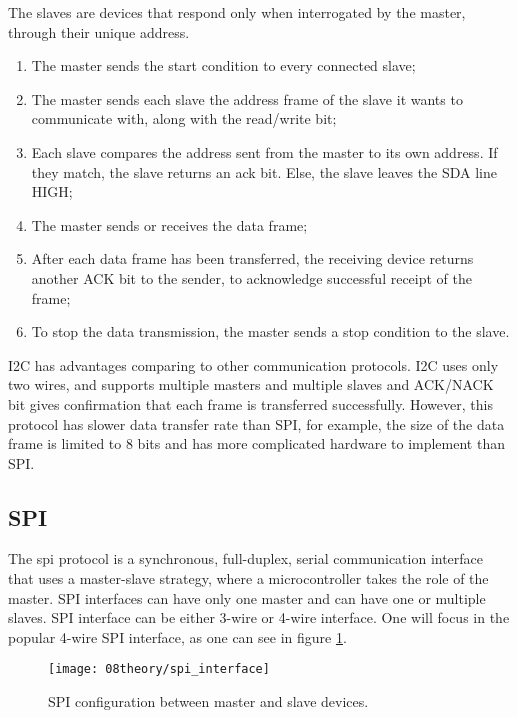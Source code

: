 The slaves are devices that respond only when interrogated by the master, through their unique address.
\begin{enumerate}
	\item The master sends the start condition to every connected slave;
	\item The master sends each slave the address frame of the slave it wants to communicate with, along with the read/write bit;
	\item Each slave compares the address sent from the master to its own address. If they match, the slave returns an \ac{ack} bit. Else, the slave leaves the SDA line HIGH;
	\item The master sends or receives the data frame;
	\item After each data frame has been transferred, the receiving device returns another ACK bit to the sender, to acknowledge successful receipt of the frame;
	\item To stop the data transmission, the master sends a stop condition to the slave.
\end{enumerate}

I2C has advantages comparing to other communication protocols. I2C uses only two wires, and supports multiple masters and multiple slaves and ACK/NACK bit gives confirmation that each frame is transferred successfully. However, this protocol has slower data transfer rate than SPI, for example, the size of the data frame is limited to 8 bits and has more complicated hardware to implement than SPI.

\clearpage
\subsection{SPI}
The \ac{spi} protocol is a synchronous, full-duplex, serial communication interface that uses a master-slave strategy, where a microcontroller takes the role of the master. SPI interfaces can have only one master and can have one or multiple slaves. SPI interface can be either 3-wire or 4-wire interface. One will focus in the popular 4-wire SPI interface, as one can see in figure \ref{fig:spi_interface}. \cite{spi_interface}

\begin{figure}[H]
	\centering
	\texttt{[image: 08theory/spi\_interface]}
	\caption{SPI configuration between master and slave devices.}
	\label{fig:spi_interface}
\end{figure}

